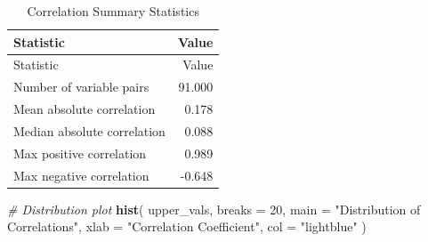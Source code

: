 \documentclass[
]{article}
\newenvironment{Shaded}{\begin{snugshade}}{\end{snugshade}}
\newcommand{\AttributeTok}[1]{\textcolor[rgb]{0.13,0.29,0.53}{#1}}
\newcommand{\CommentTok}[1]{\textcolor[rgb]{0.56,0.35,0.01}{\textit{#1}}}
\newcommand{\DecValTok}[1]{\textcolor[rgb]{0.00,0.00,0.81}{#1}}
\newcommand{\FunctionTok}[1]{\textcolor[rgb]{0.13,0.29,0.53}{\textbf{#1}}}
\newcommand{\NormalTok}[1]{#1}
\newcommand{\StringTok}[1]{\textcolor[rgb]{0.31,0.60,0.02}{#1}}
\begin{document}
\begin{longtable}[]{@{}lr@{}}
\caption{Correlation Summary Statistics}\tabularnewline
\toprule\noalign{}
Statistic & Value \\
\midrule\noalign{}
\endfirsthead
\toprule\noalign{}
Statistic & Value \\
\midrule\noalign{}
\endhead
\bottomrule\noalign{}
\endlastfoot
Number of variable pairs & 91.000 \\
Mean absolute correlation & 0.178 \\
Median absolute correlation & 0.088 \\
Max positive correlation & 0.989 \\
Max negative correlation & -0.648 \\
\end{longtable}

\begin{Shaded}
\begin{Highlighting}[]
\CommentTok{\# Distribution plot}
\FunctionTok{hist}\NormalTok{(}
\NormalTok{  upper\_vals, }\AttributeTok{breaks =} \DecValTok{20}\NormalTok{,}
  \AttributeTok{main =} \StringTok{"Distribution of Correlations"}\NormalTok{,}
  \AttributeTok{xlab =} \StringTok{"Correlation Coefficient"}\NormalTok{,}
  \AttributeTok{col =} \StringTok{"lightblue"}
\NormalTok{)}
\end{Highlighting}
\end{Shaded}
\end{document}
